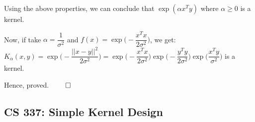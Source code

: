 \documentclass[12pt, fleqn]{article}
\begin{document}
Using the above properties, we can conclude that $\exp(\alpha x^T y)$ where $\alpha \ge 0$ is a kernel.

Now, if take $\alpha = \dfrac{1}{\sigma^2}$ and $f(x) = \exp\bigg(- \dfrac{x^T x}{2 \sigma^2}\bigg)$, we get: \\
$K_\alpha (x, y) = \exp\bigg(- \dfrac{||x - y||^2}{2 \sigma^2}\bigg) = \exp\bigg(- \dfrac{x^T x}{2 \sigma^2}\bigg) \exp\bigg(- \dfrac{y^T y}{2 \sigma^2}\bigg) \exp\bigg(\dfrac{x^T y}{\sigma^2}\bigg)$ is a kernel.

Hence, proved. \hfill $\qed$


\subsection{CS 337: Simple Kernel Design}
\subsubsection{}

\subsubsection{}
\end{document}

